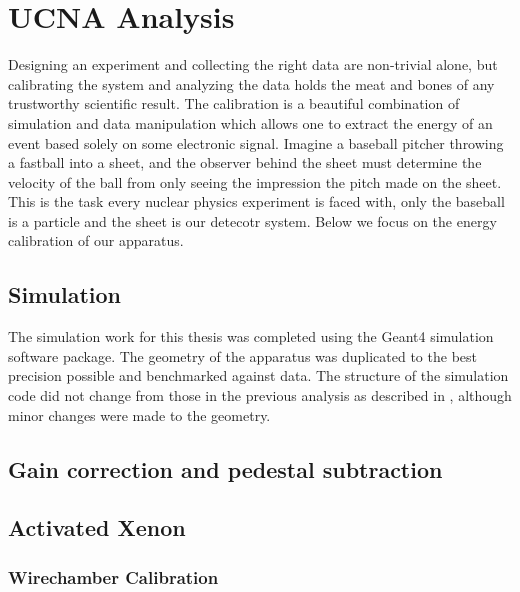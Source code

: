 \chapter{UCNA Analysis}
\label{ch:UCNA_Analysis}

Designing an experiment and collecting the right data are non-trivial alone,
but calibrating the system and analyzing the data holds the meat and bones of
any trustworthy scientific result. The calibration is a beautiful combination
of simulation and data manipulation which allows one to extract the energy of
an event based solely on some electronic signal. Imagine a baseball pitcher
throwing a fastball into a sheet, and the observer behind the sheet must
determine the velocity of the ball from only seeing the impression the pitch
made on the sheet. This is the task every nuclear physics experiment is faced
with, only the baseball is a particle and the sheet is our detecotr system.
Below we focus on the energy calibration of our apparatus.


\section{Simulation}
\label{sec:Simulation}

The simulation work for this thesis was completed using the Geant4 simulation software
package. The geometry of the apparatus was duplicated to the best precision possible
and benchmarked against data. The structure of the simulation code did not change from
those in the previous analysis as described in \cite{mpmThesis}, although minor changes
were made to the geometry.


\section{Gain correction and pedestal subtraction}

\section{Activated Xenon}
\subsection{Wirechamber Calibration}

